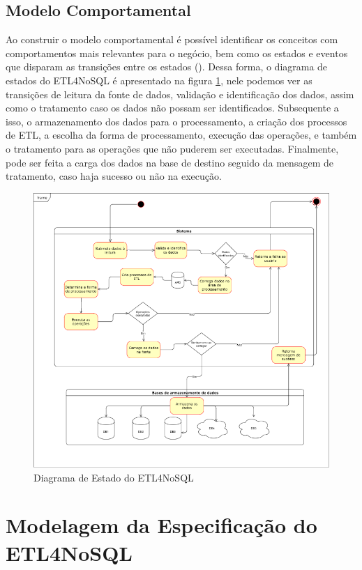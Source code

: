 \subsection{Modelo Comportamental}

Ao construir o modelo comportamental é possível identificar os conceitos com comportamentos mais relevantes para o negócio, bem como os estados e eventos que disparam as transições entre os estados (\cite{itana:2005}). Dessa forma, o diagrama de estados do ETL4NoSQL é apresentado na figura \ref{diagrama_estado}, nele podemos ver as transições de leitura da fonte de dados, validação e identificação dos dados, assim como o tratamento caso os dados não possam ser identificados. Subsequente a isso, o armazenamento dos dados para o processamento, a criação dos processos de ETL, a escolha da forma de processamento, execução das operações, e também o tratamento para as operações que não puderem ser executadas. Finalmente, pode ser feita a carga dos dados na base de destino seguido da mensagem de tratamento, caso haja sucesso ou não na execução.

\begin{figure}[h!]
	\centering
	\includegraphics[scale=0.6]{fig/diagrama_estado.png}
	\caption{Diagrama de Estado do ETL4NoSQL}
	\label{diagrama_estado}
\end{figure}

\section{Modelagem da Especificação do ETL4NoSQL}

